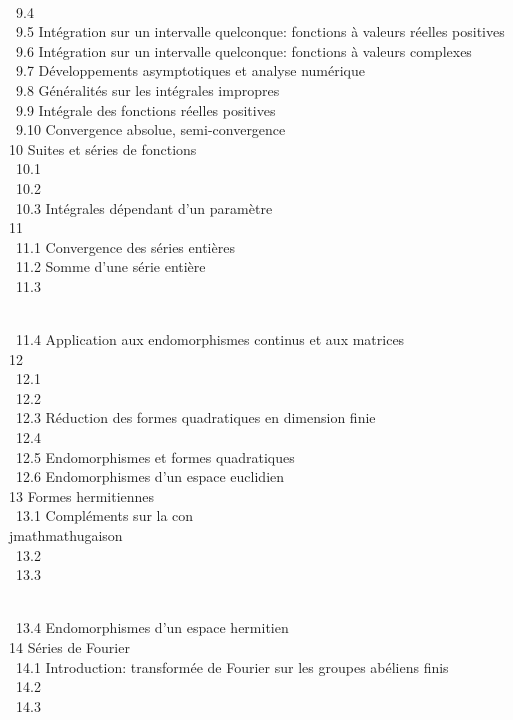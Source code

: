 \documentclass[]{article}
\begin{document}
 \\ ~9.4
 \\ ~9.5
{Intégration sur un intervalle
quelconque: fonctions à valeurs réelles positives} \\ ~9.6
{Intégration sur un intervalle
quelconque: fonctions à valeurs complexes} \\ ~9.7
{Développements asymptotiques et
analyse numérique} \\ ~9.8
{Généralités sur les intégrales
impropres} \\ ~9.9 {Intégrale des
fonctions réelles positives} \\ ~9.10
{Convergence absolue,
semi-convergence} \\ 10 {Suites et
séries de fonctions} \\ ~10.1
 \\ ~10.2
 \\ ~10.3
{Intégrales dépendant d'un
paramètre} \\ 11  \\
~11.1 {Convergence des séries
entières} \\ ~11.2 {Somme d'une
série entière} \\ ~11.3

\\ ~11.4 {Application aux
endomorphismes continus et aux matrices} \\ 12
 \\ ~12.1
 \\ ~12.2
 \\ ~12.3
{Réduction des formes quadratiques
en dimension finie} \\ ~12.4
 \\
~12.5 {Endomorphismes et formes
quadratiques} \\ ~12.6
{Endomorphismes d'un espace
euclidien} \\ 13 {Formes
hermitiennes} \\ ~13.1 {Compléments
sur la con\\jmathmathugaison} \\ ~13.2
 \\ ~13.3

\\ ~13.4 {Endomorphismes d'un
espace hermitien} \\ 14 {Séries de
Fourier} \\ ~14.1 {Introduction:
transformée de Fourier sur les groupes abéliens finis} \\ ~14.2
 \\ ~14.3
\end{document}
